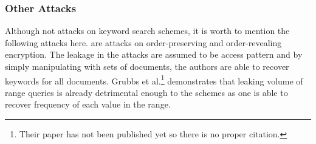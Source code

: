 \subsubsection{Other Attacks}
Although not attacks on keyword search schemes, it is worth to mention the following attacks here. \cite{CCS:KKNO16, EPRINT:LacMinPat17} are attacks on order-preserving and order-revealing encryption. The leakage in the attacks are assumed to be access pattern and by simply manipulating with sets of documents, the authors are able to recover keywords for all documents. Grubbs et al.\footnote{Their paper has not been published yet so there is no proper citation.} demonstrates that leaking volume of range queries is already detrimental enough to the schemes as one is able to recover frequency of each value in the range.














